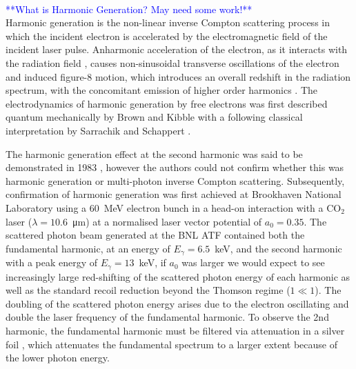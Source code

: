 \documentclass[../main.tex]{subfiles}
\begin{document}
\textcolor{blue}{\\**What is Harmonic Generation? May need some work!**\\}
Harmonic generation is the non-linear inverse Compton scattering process in which the incident electron is accelerated by the electromagnetic field of the incident laser pulse. Anharmonic acceleration of the electron, as it interacts with the radiation field \cite{englert1983second}, causes non-sinusoidal transverse oscillations of the electron and induced figure-8 motion, which introduces an overall redshift in the radiation
spectrum, with the concomitant emission of higher order harmonics \cite{sakai2015observation}. The electrodynamics of harmonic generation by free electrons was first described quantum mechanically by Brown and Kibble \cite{brown1964interaction,kibble1965frequency} with a following classical interpretation by Sarrachik and Schappert \cite{sarachik1970classical}. 

The harmonic generation effect at the second harmonic was said to be demonstrated in 1983 \cite{englert1983second}, however the authors could not confirm whether this was harmonic generation or multi-photon inverse Compton scattering. Subsequently, confirmation of harmonic generation was first achieved at Brookhaven National Laboratory \cite{babzien2006observation,kumita2006observation} using a 60~\si{\mega\electronvolt} electron bunch in a head-on interaction with a CO$_{2}$ laser ($\lambda = 10.6$~\si{\micro\meter}) at a normalised laser vector potential of $a_{0} = 0.35$. The scattered photon beam generated at the BNL ATF contained both the fundamental harmonic, at an energy of $E_{\gamma} = 6.5$~\si{\kilo\electronvolt}, and the second harmonic with a peak energy of $E_{\gamma} = 13$~\si{\kilo\electronvolt}, if $a_{0}$ was larger we would expect to see increasingly large red-shifting of the scattered photon energy of each harmonic \cite{kibble1965frequency,sakai2015observation} as well as the standard recoil reduction beyond the Thomson regime ($1 \ll 1$). The doubling of the scattered photon energy arises due to the electron oscillating and double the laser frequency of the fundamental harmonic. To observe the 2nd harmonic, the fundamental harmonic must be filtered via attenuation in a silver foil \cite{babzien2006observation}, which attenuates the fundamental spectrum to a larger extent because of the lower photon energy.
\end{document}
